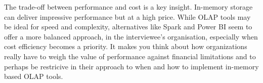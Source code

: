 The trade-off between performance and cost is a key insight. In-memory storage can deliver impressive performance but at a high price. 
While OLAP tools may be ideal for speed and complexity, alternatives like Spark and Power BI seem to offer a more balanced approach,
in the interviewee's organisation, 
especially when cost efficiency becomes a priority. 
It makes you think about how organizations really have to weigh the value of performance against financial limitations and 
to perhaps be restricive in their approach to when and how to implement in-memory based OLAP tools.





